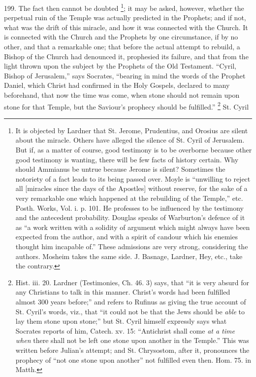 199.
The fact then cannot be doubted \footnote{It is objected by Lardner that St. Jerome, Prudentius, and Orosius are
silent about the miracle. Others have alleged the silence of St. Cyril
of Jerusalem. But if, as a matter of course, good testimony is to be
overborne because other good testimony is wanting, there will be few
facts of history certain. Why should Ammianus be untrue because Jerome
is silent? Sometimes the notoriety of a fact leads to its being passed
over. Moyle is ``unwilling to reject all [miracles since the days of
the Apostles] without reserve, for the sake of a very remarkable one
which happened at the rebuilding of the Temple,'' etc. Posth. Works,
Vol. i. p. 101. He professes to be influenced by the testimony and the
antecedent probability. Douglas speaks of Warburton's defence of it as
``a work written with a solidity of argument which might always have
been expected from the author, and with a spirit of candour which his
enemies thought him incapable of.'' These admissions are very strong,
considering the authors. Mosheim takes the same side. J. Basnage,
Lardner, Hey, etc., take the contrary.}; it may be asked, however, whether the perpetual ruin of the
Temple was actually predicted in the Prophets; and if not, what was
the drift of this miracle, and how it was connected with the Church.
It is connected with the Church and the Prophets by one circumstance,
if by no other, and that a remarkable one; that before the actual
attempt to rebuild, a Bishop of the Church had denounced it,
prophesied its failure, and that from the light thrown upon the
subject by the Prophets of the Old Testament. ``Cyril, Bishop of
Jerusalem,'' says Socrates, ``bearing in mind the words of the Prophet
Daniel, which Christ had confirmed in the Holy Gospels, declared to
many beforehand, that now the time was come, when stone should not
remain upon stone for that Temple, but the Saviour's prophecy should
be fulfilled.'' \footnote{Hist. iii. 20. Lardner (Testimonies, Ch. 46. 3) says, that ``it is very
absurd for any Christians to talk in this manner. Christ's words had
been fulfilled almost 300 years before;'' and refers to Rufinus as
giving the true account of St. Cyril's words, viz., that ``it could not
be that the Jews should be \emph{able} to lay them stone upon stone;''
but St. Cyril himself expressly says what Socrates reports of him,
Catech. xv. 15: ``Antichrist shall come \emph{at a time when} there
shall not be left one stone upon another in the Temple.'' This was
written before Julian's attempt; and St. Chrysostom, after it,
pronounces the prophecy of ``not one stone upon another'' not fulfilled
even then. Hom. 75. in Matth.} St. Cyril
